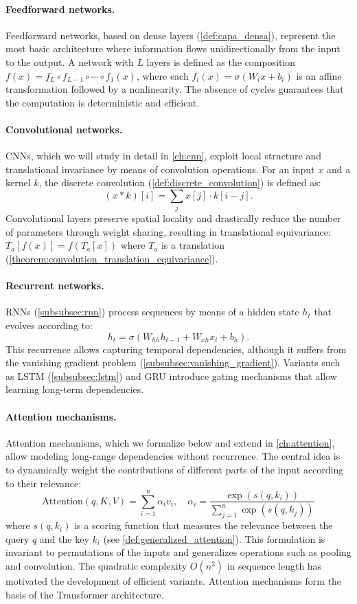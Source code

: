 \paragraph{Feedforward networks.}
Feedforward networks, based on dense layers (\autoref{def:capa_densa}), represent the most basic architecture where information flows unidirectionally from the input to the output. A network with $L$ layers is defined as the composition $f(x) = f_L \circ f_{L-1} \circ \cdots \circ f_1(x)$, where each $f_i(x) = \sigma(W_i x + b_i)$ is an affine transformation followed by a nonlinearity. The absence of cycles guarantees that the computation is deterministic and efficient.

\paragraph{Convolutional networks.}
\glspl{CNN}, which we will study in detail in \autoref{ch:cnn}, exploit local structure and translational invariance by means of convolution operations. For an input $x$ and a kernel $k$, the discrete convolution (\autoref{def:discrete_convolution}) is defined as:
\[
	(x * k)[i] = \sum_j x[j] \cdot k[i-j].
\]
Convolutional layers preserve spatial locality and drastically reduce the number of parameters through weight sharing, resulting in translational equivariance: $T_a[f(x)] = f(T_a[x])$ where $T_a$ is a translation (\autoref{theorem:convolution_translation_equivariance}).

\paragraph{Recurrent networks.}
\glspl{RNN} (\autoref{subsubsec:rnn}) process sequences by means of a hidden state $h_t$ that evolves according to:
\[
	h_t = \sigma(W_{hh} h_{t-1} + W_{xh} x_t + b_h).
\]
This recurrence allows capturing temporal dependencies, although it suffers from the vanishing gradient problem (\autoref{subsubsec:vanishing_gradient}). Variants such as \gls{LSTM} (\autoref{subsubsec:lstm}) and \gls{GRU} introduce gating mechanisms that allow learning long-term dependencies.

\paragraph{Attention mechanisms.}\label{par:atencion_arquitecturas}
Attention mechanisms, which we formalize below and extend in \autoref{ch:attention}, allow modeling long-range dependencies without recurrence. The central idea is to dynamically weight the contributions of different parts of the input according to their relevance:
\[
	\text{Attention}(q, K, V) = \sum_{i=1}^n \alpha_i v_i, \quad \alpha_i = \frac{\exp(s(q, k_i))}{\sum_{j=1}^n \exp(s(q, k_j))}
\]
where $s(q, k_i)$ is a scoring function that measures the relevance between the query $q$ and the key $k_i$ (see \autoref{def:generalized_attention}). This formulation is invariant to permutations of the inputs and generalizes operations such as pooling and convolution. The quadratic complexity $O(n^2)$ in sequence length has motivated the development of efficient variants. Attention mechanisms form the basis of the \gls{Transformer} architecture.

